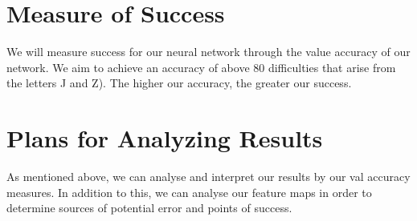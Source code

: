 \documentclass[11pt]{article}
\begin{document}
\section{Measure of Success}

We will measure success for our neural network through the value accuracy of
our network. We aim to achieve an accuracy of above 80%
difficulties that arise from the letters J and Z). The higher our accuracy, the
greater our success.

\section{Plans for Analyzing Results}

As mentioned above, we can analyse and interpret our results by our val accuracy
measures. In addition to this, we can analyse our feature maps in order to determine
sources of potential error and points of success.
\end{document}
